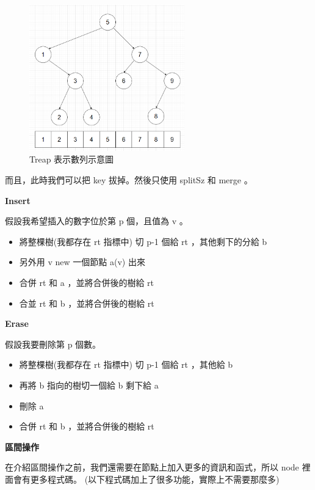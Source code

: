     \begin{figure}[!htbp]
        \centering
        \includegraphics[width=0.6\textwidth]{../Images/Treap1.png}
        \caption{Treap 表示數列示意圖}
    \end{figure}

    而且，此時我們可以把 key 拔掉。然後只使用 splitSz 和 merge 。

    \textbf{Insert}

    假設我希望插入的數字位於第 p 個，且值為 v 。

    \begin{itemize}
        \item 將整棵樹(我都存在 rt 指標中) 切 p-1 個給 rt ，其他剩下的分給 b 
        \item 另外用 v new 一個節點 a(v) 出來
        \item 合併 rt 和 a ，並將合併後的樹給 rt 
        \item 合並 rt 和 b ，並將合併後的樹給 rt
    \end{itemize}

    \textbf{Erase}

    假設我要刪除第 p 個數。

    \begin{itemize}
        \item 將整棵樹(我都存在 rt 指標中) 切 p-1 個給 rt ，其他給 b
        \item 再將 b 指向的樹切一個給 b 剩下給 a
        \item 刪除 a 
        \item 合併 rt 和 b ，並將合併後的樹給 rt
    \end{itemize}

    \textbf{區間操作}

    在介紹區間操作之前，我們還需要在節點上加入更多的資訊和函式，所以 node 裡面會有更多程式碼。
    (以下程式碼加上了很多功能，實際上不需要那麼多)

